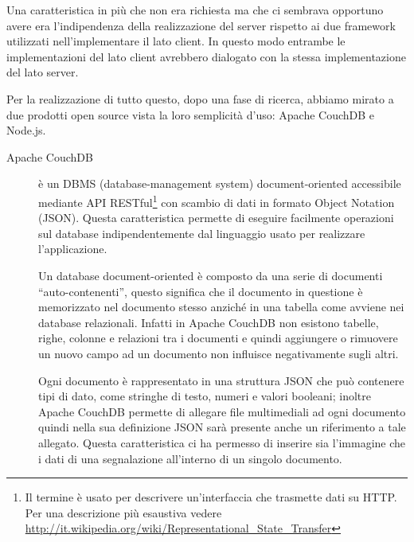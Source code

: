         Una caratteristica in più che non era richiesta ma che ci sembrava
        opportuno avere era l'indipendenza della realizzazione del server
        rispetto ai due frame\-work utilizzati nell'implementare il lato client.
        In questo modo entrambe le implementazioni del lato client avrebbero
        dialogato con la stessa implementazione del lato server.

        Per la realizzazione di tutto questo, dopo una fase di ricerca, abbiamo
        mirato a due prodotti open source vista la loro semplicità d'uso:
        Apache CouchDB\texttrademark{} e Node.js.
        \begin{description}
            \item[Apache CouchDB\texttrademark{}] è un DBMS (database-management
                system) doc\-u\-ment-ori\-ented accessibile mediante API RESTful\footnote{Il termine è usato
                per descrivere un'interfaccia che trasmette dati su HTTP. Per una
                descrizione più esaustiva vedere
                \url{http://it.wikipedia.org/wiki/Representational_State_Transfer}}
                con scambio di dati in formato \js{} Object Notation (JSON). Questa
                caratteristica permette di eseguire facilmente operazioni sul database
                indipendentemente dal linguaggio usato per realizzare l'applicazione.

                Un database document-oriented è composto da una serie di documenti
                ``auto-contenenti'', questo significa che il documento in
                questione è memorizzato nel documento stesso anziché in una tabella
                come avviene nei database relazionali. Infatti in Apache CouchDB\texttrademark{}
                non esistono tabelle, righe, colonne e relazioni tra i
                documenti e quindi aggiungere o rimuovere un nuovo
                campo ad un documento non influisce negativamente sugli altri.

                Ogni documento è rappresentato in una struttura JSON che può
                contenere tipi di dato, come stringhe di testo, numeri e valori
                booleani; inoltre Apache CouchDB\texttrademark{} permette
                di allegare file multimediali ad ogni documento quindi nella sua
                definizione JSON sarà presente anche un riferimento a tale allegato.
                Questa caratteristica ci ha permesso di inserire sia l'immagine che
                i dati di una segnalazione all'interno di un singolo documento.


\end{description}

